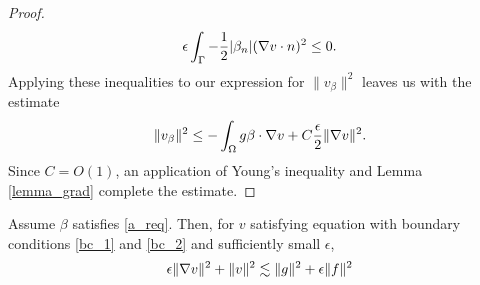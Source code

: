 \begin{proof}
\[
 \epsilon\int_{\Gamma}  -\frac{1}{2}|\beta_n| (\grad v \cdot n)^2 \leq 0.
\]
Applying these inequalities to our expression for $\|v_\beta\|^2$ leaves us with the estimate
\[
\|v_\beta\|^2 \leq  -\int_{\Omega}g\beta\cdot \grad v + C\frac{\epsilon}{2} \|\grad v\|^2.
\]
Since $C=O(1)$, an application of Young's inequality and Lemma \ref{lemma_grad} complete the estimate.
\end{proof}

\begin{lemma} 
\label{lemma_grad}
Assume $\beta$ satisfies \eqref{a_req}.  Then, for $v$ satisfying equation  with boundary conditions \eqref{bc_1} and \eqref{bc_2} and sufficiently small $\epsilon$, 
\[
\epsilon \|\grad v\|^2 + \|v\|^2 \lesssim \|g\|^2 + \epsilon \| f\|^2
\]
\end{lemma}

